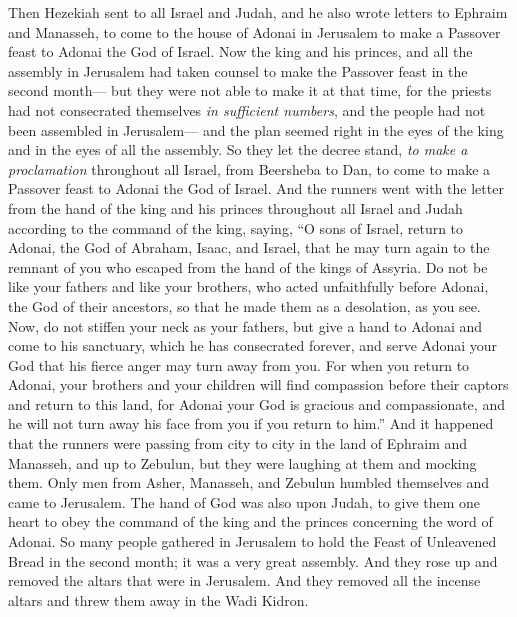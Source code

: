 \begin{biblechapter} %
 Then Hezekiah sent to all Israel and Judah, and he also wrote letters to Ephraim and Manasseh, to come to the house of Adonai in Jerusalem to make a Passover feast to Adonai the God of Israel.
\verse Now the king and his princes, and all the assembly in Jerusalem had taken counsel to make the Passover feast in the second month—
\verse but they were not able to make it at that time, for the priests had not consecrated themselves \textit{in sufficient numbers}, and the people had not been assembled in Jerusalem—
\verse and the plan seemed right in the eyes of the king and in the eyes of all the assembly.
\verse So they let the decree stand, \textit{to make a proclamation} throughout all Israel, from Beersheba to Dan, to come to make a Passover feast to Adonai the God of Israel.
\verse And the runners went with the letter from the hand of the king and his princes throughout all Israel and Judah according to the command of the king, saying, “O sons of Israel, return to Adonai, the God of Abraham, Isaac, and Israel, that he may turn again to the remnant of you who escaped from the hand of the kings of Assyria.
\verse Do not be like your fathers and like your brothers, who acted unfaithfully before Adonai, the God of their ancestors, so that he made them as a desolation, as you see.
\verse Now, do not stiffen your neck as your fathers, but give a hand to Adonai and come to his sanctuary, which he has consecrated forever, and serve Adonai your God that his fierce anger may turn away from you.
\verse For when you return to Adonai, your brothers and your children will find compassion before their captors and return to this land, for Adonai your God is gracious and compassionate, and he will not turn away his face from you if you return to him.”
\verse And it happened that the runners were passing from city to city in the land of Ephraim and Manasseh, and up to Zebulun, but they were laughing at them and mocking them.
\verse Only men from Asher, Manasseh, and Zebulun humbled themselves and came to Jerusalem.
\verse The hand of God was also upon Judah, to give them one heart to obey the command of the king and the princes concerning the word of Adonai.
\verse So many people gathered in Jerusalem to hold the Feast of Unleavened Bread in the second month; it was a very great assembly.
\verse And they rose up and removed the altars that were in Jerusalem. And they removed all the incense altars and threw them away in the Wadi Kidron.

\end{biblechapter}
